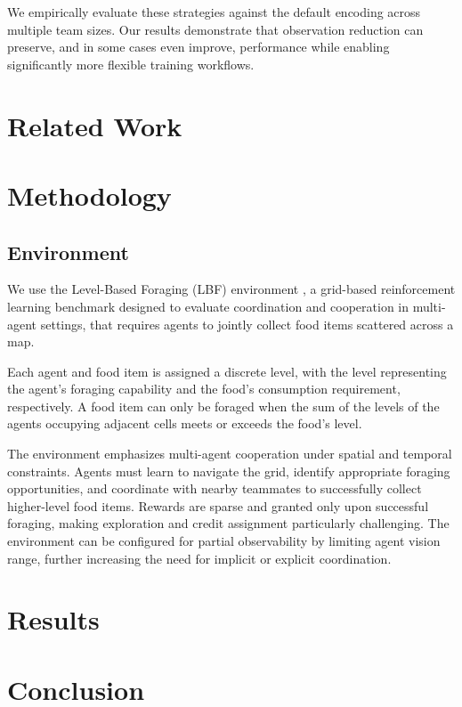 \documentclass{article}
\begin{document}
We empirically evaluate these strategies against the default encoding across multiple team sizes.
Our results demonstrate that observation reduction can preserve, and in some cases even improve,
performance while enabling significantly more flexible training workflows.



\section{Related Work}

\cite{busoniu2008} %

\section{Methodology}




\subsection{Environment}

We use the Level-Based Foraging (LBF) environment \cite{papoudakis2021},
a grid-based reinforcement learning benchmark designed to evaluate 
coordination and cooperation in multi-agent settings,
that requires agents to jointly collect food items scattered across a map. 

Each agent and food item is assigned a discrete level, with the level representing 
the agent's foraging capability and the food's consumption requirement, respectively.
A food item can only be foraged when the sum of the levels of the agents 
occupying adjacent cells meets or exceeds the food's level.

The environment emphasizes multi-agent cooperation under spatial and temporal constraints. 
Agents must learn to navigate the grid, identify appropriate foraging opportunities, 
and coordinate with nearby teammates to successfully collect higher-level food items. 
Rewards are sparse and granted only upon successful foraging, 
making exploration and credit assignment particularly challenging. 
The environment can be configured for partial observability by limiting agent vision range, 
further increasing the need for implicit or explicit coordination.

\section{Results}

\section{Conclusion}

\printbibliography
\end{document}
